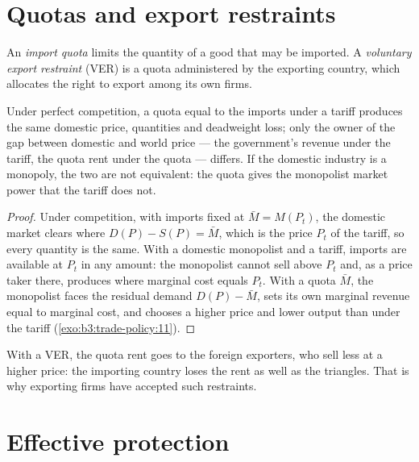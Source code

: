 \section{Quotas and export restraints}\label{sec:b3:trade-policy:quotas}

\begin{definition}\label{def:b3:trade-policy:quota}
An \emph{import quota} limits the quantity of a good that may be imported. A
\emph{voluntary export restraint} (VER) is a quota administered by the exporting
country, which allocates the right to export among its own firms.
\end{definition}

\begin{proposition}\label{prop:b3:trade-policy:quota}
Under perfect competition, a quota equal to the imports under a tariff produces
the same domestic price, quantities and deadweight loss; only the owner of the
gap between domestic and world price --- the government's revenue under the
tariff, the quota rent under the quota --- differs. If the domestic industry is a
monopoly, the two are not equivalent: the quota gives the monopolist market power
that the tariff does not.
\end{proposition}

\begin{proof}
Under competition, with imports fixed at $\bar M = M(P_t)$, the domestic market
clears where $D(P) - S(P) = \bar M$, which is the price $P_t$ of the tariff, so every
quantity is the same. With a domestic monopolist and a tariff, imports are
available at $P_t$ in any amount: the monopolist cannot sell above $P_t$ and, as a
price taker there, produces where marginal cost equals $P_t$. With a quota $\bar M$,
the monopolist faces the residual demand $D(P) - \bar M$, sets its own marginal revenue
equal to marginal cost, and chooses a higher price and lower output than under the
tariff (\cref{exo:b3:trade-policy:11}).
\end{proof}

With a VER, the quota rent goes to the foreign exporters, who sell less at a higher
price: the importing country loses the rent as well as the triangles. That is why
exporting firms have accepted such restraints.

\section{Effective protection}\label{sec:b3:trade-policy:erp}

